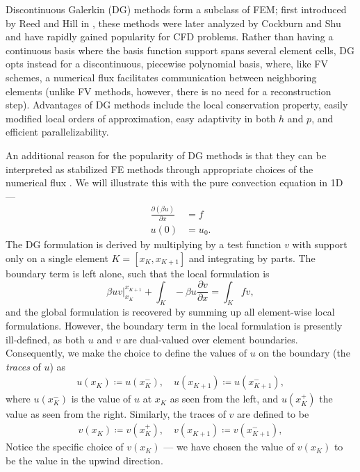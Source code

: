 \documentclass{report}
\newcommand{\pd}[2]{\frac{\partial#1}{\partial#2}}
\begin{document}
Discontinuous Galerkin (DG) methods form a subclass of FEM; first introduced by Reed and Hill in \cite{Reed:73}, these methods were later analyzed by Cockburn and Shu \cite{CockburnShu:DG} and have rapidly gained popularity for CFD problems. Rather than having a continuous basis where the basis function support spans several element cells, DG opts instead for a discontinuous, piecewise polynomial basis, where, like FV schemes, a numerical flux facilitates communication between neighboring elements (unlike FV methods, however, there is no need for a reconstruction step). Advantages of DG methods include the local conservation property, easily modified local orders of approximation, easy adaptivity in both $h$ and $p$, and efficient parallelizability. 

An additional reason for the popularity of DG methods is that they can be interpreted as stabilized FE methods through appropriate choices of the numerical flux \cite{Brezzi20063293}. We will illustrate this with the pure convection equation in 1D ---
\begin{align*}
\pd{\left(\beta u\right)}{x} &= f\\
u(0) &= u_0.
\end{align*}
The DG formulation is derived by multiplying by a test function $v$ with support only on a single element $K = [x_K,x_{K+1}]$ and integrating by parts. The boundary term is left alone, such that the local formulation is 
\[
\left.\beta u v\right|_{x_K}^{x_{K+1}} + \int_K -\beta u \pd{v}{x} = \int_K f v,
\]
and the global formulation is recovered by summing up all element-wise local formulations. However, the boundary term in the local formulation is presently ill-defined, as both $u$ and $v$ are dual-valued over element boundaries. Consequently, we make the choice to define the values of $u$ on the boundary (the \emph{traces} of $u$) as
\begin{align*}
u(x_K) \coloneqq u(x_K^-), \quad u(x_{K+1}) \coloneqq u(x_{K+1}^-),
\end{align*}
where $u(x_K^-)$ is the value of $u$ at $x_K$ as seen from the left, and $u(x_K^+)$ the value as seen from the right. Similarly, the traces of $v$ are defined to be
\begin{align*}
v(x_K) \coloneqq v(x_K^+), \quad v(x_{K+1}) \coloneqq v(x_{K+1}^-),
\end{align*}
Notice the specific choice of $v(x_K)$ --- we have chosen the value of $v(x_K)$ to be the value in the upwind direction. 

\end{document}

